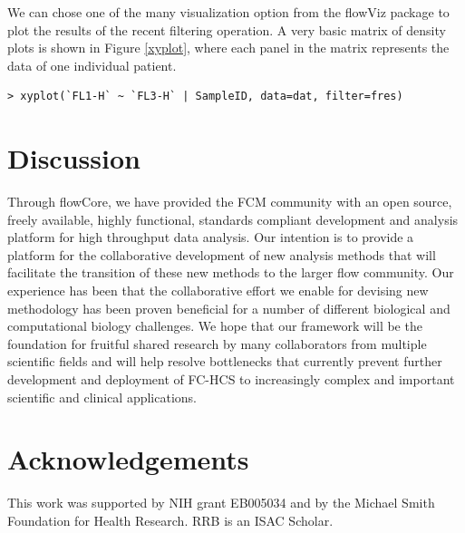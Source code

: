 \documentclass[12pt]{article}
\newcommand{\Rpackage}[1]{{\textsf{#1}}}
\begin{document}
We can chose one of the many visualization option from the flowViz
package to plot the results of the recent filtering operation. A very
basic matrix of density plots is shown in Figure \ref{xyplot}, where
each panel in the matrix represents the data of one individual
patient.

\begin{verbatim}
> xyplot(`FL1-H` ~ `FL3-H` | SampleID, data=dat, filter=fres)
\end{verbatim}


\section*{Discussion}

Through \Rpackage{flowCore}, we have provided the FCM community with
an open source, freely available, highly functional, standards
compliant development and analysis platform for high throughput data
analysis.  Our intention is to provide a platform for the
collaborative development of new analysis methods that will facilitate
the transition of these new methods to the larger flow community.  Our
experience has been that the collaborative effort we enable for
devising new methodology has been proven beneficial for a number of
different biological and computational biology challenges.  We hope
that our framework will be the foundation for fruitful shared research
by many collaborators from multiple scientific fields and will help
resolve bottlenecks that currently prevent further development and
deployment of FC-HCS to increasingly complex and important scientific
and clinical applications.

\section*{Acknowledgements}
This work was supported by NIH grant EB005034 and by the Michael Smith
Foundation for Health Research. RRB is an ISAC Scholar.



  
 
\end{document}

